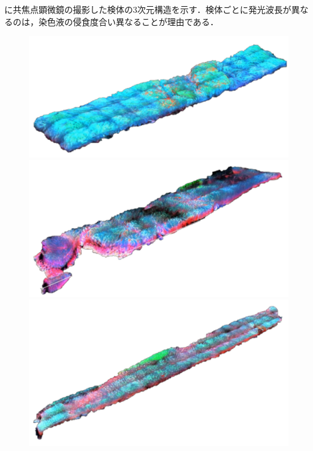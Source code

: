 に共焦点顕微鏡の撮影した検体の3次元構造を示す．検体ごとに発光波長が異なるのは，染色液の侵食度合い異なることが理由である．

\begin{figure}[H]
	\centering
	
	\begin{minipage}{0.45\columnwidth}
		\centering
		\includegraphics[clip, width=\linewidth]{fig/chapter3/3d_samples/sample_A_clip}
	\end{minipage}
	\begin{minipage}{0.45\linewidth}
		\centering
		\includegraphics[clip, width=\linewidth]{fig/chapter3/3d_samples/sample_B_clip}
	\end{minipage}
	\begin{minipage}{0.45\columnwidth}
		\centering
		\includegraphics[clip, width=\linewidth]{fig/chapter3/3d_samples/sample_C_clip}

\end{minipage}
\end{figure}
